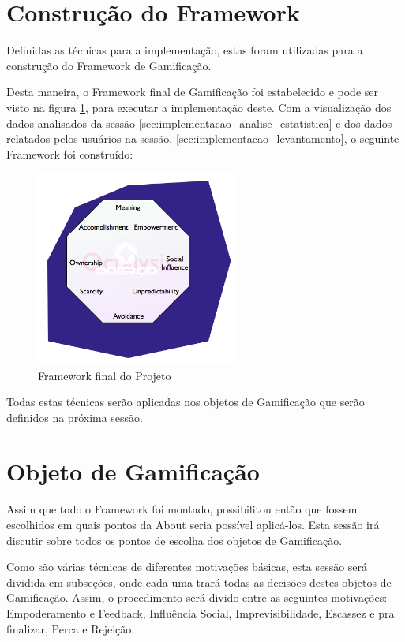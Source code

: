 \section{Construção do Framework}
\label{sec:gamifição}
Definidas as técnicas para a implementação, estas foram utilizadas para a construção do Framework
de Gamificação.

Desta maneira, o Framework final de Gamificação foi estabelecido e pode ser visto
na figura \ref{fig:final_project_octalisys}, para executar a implementação
deste. Com a visualização dos dados analisados da sessão \ref{sec:implementacao_analise_estatistica}
e dos dados relatados pelos usuários na sessão, \ref{sec:implementacao_levantamento}, o seguinte Framework
foi construído:

\begin{figure}[h]
    \centering

    \includegraphics[width=250px, scale=1]{figuras/final_framework}
    \caption{Framework final do Projeto}

    \label{fig:final_project_octalisys}
\end{figure}

Todas estas técnicas serão aplicadas nos objetos de Gamificação que  serão definidos na próxima sessão.

\section{Objeto de Gamificação}
\label{sec:implementacao_objeto_gamificao}
Assim que todo o Framework foi montado, possibilitou então que fossem escolhidos em quais
pontos da About seria possível aplicá-los. Esta sessão irá discutir sobre todos os pontos de escolha
dos objetos de Gamificação.

Como são várias técnicas de diferentes motivações básicas, esta sessão será dividida em subseções, onde
cada uma trará todas as decisões destes objetos de Gamificação. Assim, o procedimento será divido entre
as seguintes motivações: Empoderamento e Feedback, Influência Social, Imprevisibilidade,
Escassez e pra finalizar,  Perca e Rejeição.

